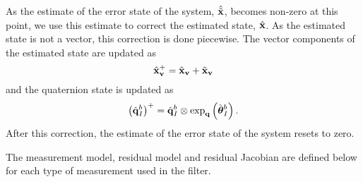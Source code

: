 As the estimate of the error state of the system, $\hat{\tilde{\boldsymbol{\mathrm{x}}}}$, becomes
non-zero at this point, we use this estimate to correct the estimated state,
$\hat{\boldsymbol{\mathrm{x}}}$. As the estimated state is not a vector, this correction is done
piecewise. The vector components of the estimated state are
updated as
\begin{equation}
  \hat{\boldsymbol{\mathrm{\boldsymbol{\mathrm{x}}}}}_{\boldsymbol{\mathrm{v}}}^{+} = \hat{\boldsymbol{\mathrm{\boldsymbol{\mathrm{x}}}}}_{\boldsymbol{\mathrm{v}}} + \tilde{\boldsymbol{\mathrm{\boldsymbol{\mathrm{x}}}}}_{\boldsymbol{\mathrm{v}}}
\end{equation}
and the quaternion state is updated as
\begin{equation}
  \left( \hat{\boldsymbol{\mathrm{q}}}_I^b \right)^{+}  = \hat{\boldsymbol{\mathrm{q}}}_I^b \otimes \exp_{\boldsymbol{\mathrm{q}}} \left(
  \tilde{\boldsymbol{\mathrm{\theta}}}_I^b \right).
\end{equation}
After this correction, the estimate of the error state of the system resets to
zero.

The measurement model, residual model and residual
Jacobian are defined below for each type of measurement used in the filter.

